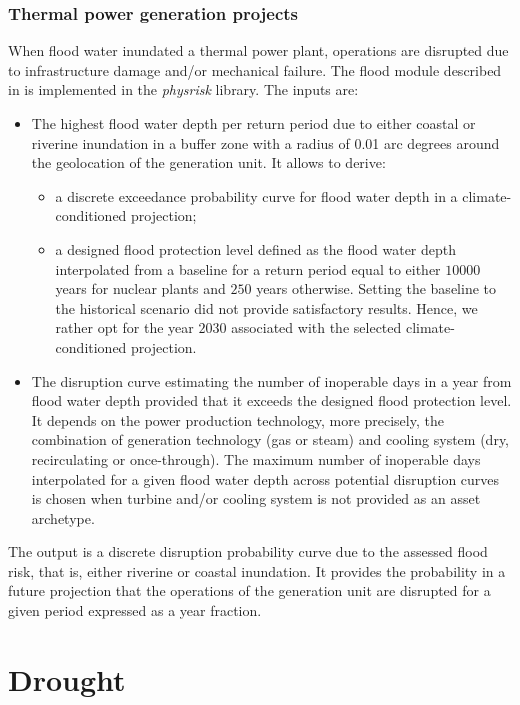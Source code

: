\documentclass[a4paper,11pt]{extarticle} %
\theoremstyle{definition}
\begin{document}
\subsubsection{Thermal power generation projects}
When flood water inundated a thermal power plant, operations are disrupted due to infrastructure damage and/or mechanical failure. The flood module described in \cite{LuoEtAl:2021,LuoEtAl:2023} is implemented in the \emph{physrisk} library. The inputs are:
\begin{itemize}
\item The highest flood water depth per return period due to either coastal or riverine inundation in a buffer zone with a radius of 0.01 arc degrees around the geolocation of the generation unit. It allows to derive:
\begin{itemize}
\item a discrete exceedance probability curve for flood water depth in a climate-conditioned projection;
\item a designed flood protection level defined as the flood water depth interpolated from a baseline for a return period equal to either $10000$ years for nuclear plants and $250$ years otherwise. Setting the baseline to the historical scenario did not provide satisfactory results. Hence, we rather opt for the year $2030$ associated with the selected climate-conditioned projection.
\end{itemize}
\item The disruption curve estimating the number of inoperable days in a year from flood water depth provided that it exceeds the designed flood protection level. It depends on the power production technology, more precisely, the combination of generation technology (gas or steam) and cooling system (dry, recirculating or once-through). The maximum number of inoperable days interpolated for a given flood water depth across potential disruption curves is chosen when turbine and/or cooling system is not provided as an asset archetype.
\end{itemize}
The output is a discrete disruption probability curve due to the assessed flood risk, that is, either riverine or coastal inundation. It provides the probability in a future projection that the operations of the generation unit are disrupted for a given period expressed as a year fraction.

\section{Drought}
\end{document}
